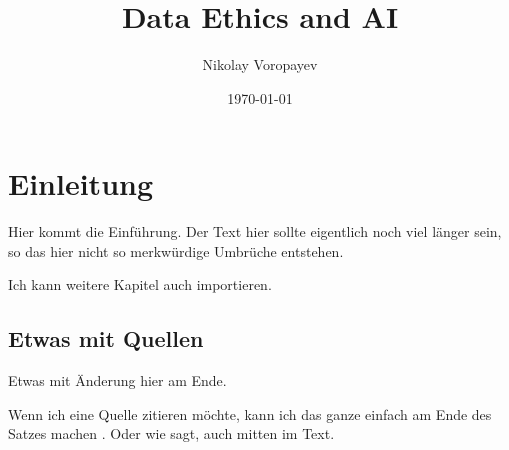 \documentclass{report}
\title{Data Ethics and AI}
\author{Nikolay Voropayev}
\date{\today}
\begin{document}
\maketitle


\tableofcontents

\chapter{Einleitung}

Hier kommt die Einführung. Der Text hier sollte eigentlich noch viel länger sein, so das hier nicht so merkwürdige Umbrüche entstehen.

Ich kann weitere Kapitel auch importieren.



\section{Etwas mit Quellen}

Etwas mit Änderung hier am Ende.

Wenn ich eine Quelle zitieren möchte, kann ich das ganze einfach am Ende des Satzes machen \citep{example}. Oder wie \citet{example} sagt, auch mitten im Text.

\printbibliography
\end{document}
